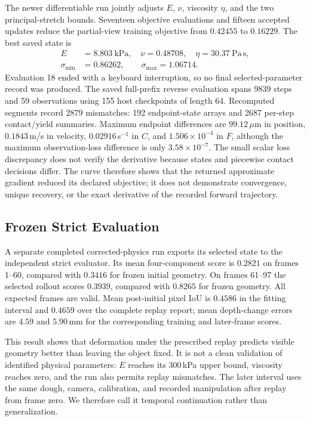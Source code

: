 The newer differentiable run jointly adjusts $E$, $\nu$, viscosity $\eta$, and the two principal-stretch bounds. Seventeen objective evaluations and fifteen accepted updates reduce the partial-view training objective from $0.42455$ to $0.16229$. The best saved state is
\begin{equation}
\begin{split}
E&=8.803\ \mathrm{kPa},\quad \nu=0.48708,\quad
\eta=30.37\ \mathrm{Pa\,s},\\
\sigma_{\min}&=0.86262,\qquad \sigma_{\max}=1.06714.
\end{split}
\end{equation}
Evaluation 18 ended with a keyboard interruption, so no final selected-parameter record was produced. The saved full-prefix reverse evaluation spans 9839 steps and 59 observations using 155 host checkpoints of length 64. Recomputed segments record 2879 mismatches: 192 endpoint-state arrays and 2687 per-step contact/yield summaries. Maximum endpoint differences are $99.12\,\mu$m in position, $0.1843$\,m/s in velocity, $0.02916$\,s$^{-1}$ in $C$, and $1.506\!\times\!10^{-4}$ in $F$, although the maximum observation-loss difference is only $3.58\!\times\!10^{-7}$. The small scalar loss discrepancy does not verify the derivative because states and piecewise contact decisions differ. The curve therefore shows that the returned approximate gradient reduced its declared objective; it does not demonstrate convergence, unique recovery, or the exact derivative of the recorded forward trajectory.

\subsection{Frozen Strict Evaluation}
A separate completed corrected-physics run exports its selected state to the independent strict evaluator. Its mean four-component score is $0.2821$ on frames 1--60, compared with $0.3416$ for frozen initial geometry. On frames 61--97 the selected rollout scores $0.3939$, compared with $0.8265$ for frozen geometry. All expected frames are valid. Mean post-initial pixel IoU is $0.4586$ in the fitting interval and $0.4659$ over the complete replay report; mean depth-change errors are $4.59$ and $5.90$\,mm for the corresponding training and later-frame scores.

This result shows that deformation under the prescribed replay predicts visible geometry better than leaving the object fixed. It is not a clean validation of identified physical parameters: $E$ reaches its $300$\,kPa upper bound, viscosity reaches zero, and the run also permits replay mismatches. The later interval uses the same dough, camera, calibration, and recorded manipulation after replay from frame zero. We therefore call it temporal continuation rather than generalization.

